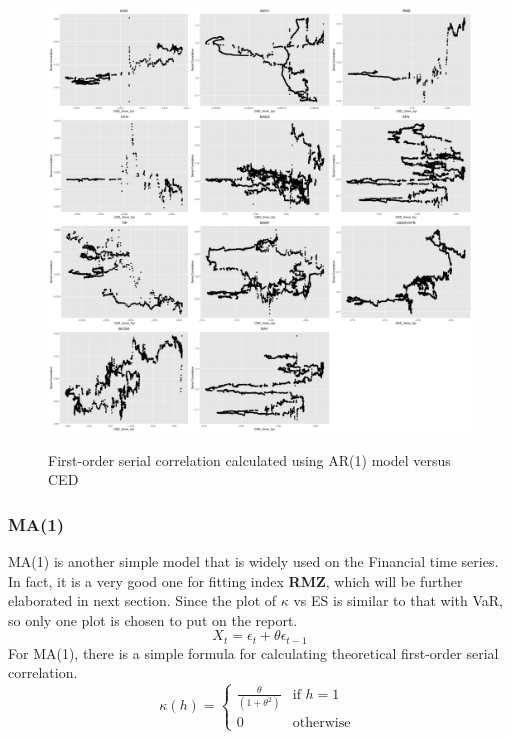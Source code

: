 \documentclass[12pt]{article}
\begin{document}
\begin{figure}
  \caption{First-order serial correlation calculated using AR(1) model versus CED}
  \includegraphics[width = 1\textwidth]{../results/SerCol-CED5yr3monAR1}
  \label{fig:SerCol-CED5yr3monAR1}
\end{figure}

\fi


\subsubsection{MA(1)}
MA(1) is another simple model that is widely used on the Financial time series. In fact, it is a very good one for fitting index \textbf{RMZ}, which will be further elaborated in next section. Since the plot of $\kappa$ vs ES is similar to that with VaR, so only one plot is chosen to put on the report.
\begin{equation}
X_t = \epsilon_t + \theta\epsilon_{t-1}
\end{equation}
For MA(1), there is a simple formula for calculating theoretical first-order serial correlation.
\begin{equation}
\kappa(h) = \begin{cases} \frac{\theta}{(1+\theta^2)} &\mbox{if } h = 1 \\ 
0 & \mbox{otherwise } \end{cases}
\end{equation}
\end{document}
